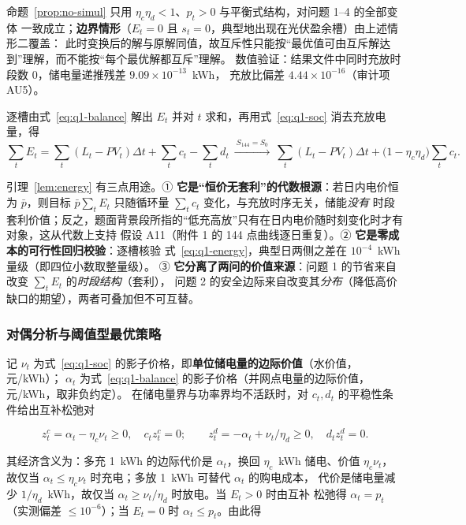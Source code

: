 命题~\ref{prop:no-simul} 只用 \(\eta_c\eta_d<1\)、\(p_t>0\) 与平衡式结构，对问题 1--4 的全部变体
一致成立；\textbf{边界情形}（\(E_t=0\) 且 \(s_t=0\)，典型地出现在光伏盈余槽）由上述情形二覆盖：
此时变换后的解与原解同值，故互斥性只能按“最优值可由互斥解达到”理解，而不能按“每个最优解都互斥”理解。
数值验证：结果文件中同时充放时段数 0，储电量递推残差 \(9.09\times10^{-13}\)~kWh，
充放比偏差 \(4.44\times10^{-16}\)（审计项 AU5）。

\begin{lemma}[能量恒等式]\label{lem:energy}
逐槽由式~\eqref{eq:q1-balance} 解出 \(E_t\) 并对 \(t\) 求和，再用式~\eqref{eq:q1-soc} 消去充放电量，得
\begin{equation}
  \sum_{t}E_t=\sum_{t}(L_t-PV_t)\Delta t+\sum_{t}c_t-\sum_{t}d_t
  \ \xrightarrow{\ S_{144}=S_0\ }\
  \sum_{t}(L_t-PV_t)\Delta t+\bigl(1-\eta_c\eta_d\bigr)\sum_{t}c_t .
  \label{eq:q1-energy}
\end{equation}
\end{lemma}

引理~\ref{lem:energy} 有三点用途。① \textbf{它是“恒价无套利”的代数根源}：若日内电价恒为
\(\bar p\)，则目标 \(\bar p\sum_tE_t\) 只随循环量 \(\sum_tc_t\) 变化，与充放时序无关，储能\emph{没有}
时段套利价值；反之，题面背景段所指的“低充高放”只有在日内电价随时刻变化时才有对象，这从代数上支持
假设 A11（附件 1 的 144 点曲线逐日重复）。② \textbf{它是零成本的可行性回归校验}：逐槽核验
式~\eqref{eq:q1-energy}，典型日两侧之差在 \(10^{-4}\)~kWh 量级（即四位小数取整量级）。
③ \textbf{它分离了两问的价值来源}：问题 1 的节省来自改变 \(\sum_tE_t\) 的\emph{时段结构}（套利），
问题 2 的安全边际来自改变其\emph{分布}（降低高价缺口的期望），两者可叠加但不可互替。

\subsubsection{对偶分析与阈值型最优策略}

记 \(\nu_t\) 为式~\eqref{eq:q1-soc} 的影子价格，即\textbf{单位储电量的边际价值}（水价值，元/kWh）；
\(\alpha_t\) 为式~\eqref{eq:q1-balance} 的影子价格（并网点电量的边际价值，元/kWh，取非负约定）。
在储电量界与功率界均不活跃时，对 \(c_t,d_t\) 的平稳性条件给出互补松弛对

\begin{equation}
  z^{c}_t=\alpha_t-\eta_c\nu_t\ge0,\quad c_tz^{c}_t=0;\qquad
  z^{d}_t=-\alpha_t+\nu_t/\eta_d\ge0,\quad d_tz^{d}_t=0 .
  \label{eq:q1-kkt}
\end{equation}

其经济含义为：多充 1~kWh 的边际代价是 \(\alpha_t\)，换回 \(\eta_c\)~kWh 储电、价值
\(\eta_c\nu_t\)，故仅当 \(\alpha_t\le\eta_c\nu_t\) 时充电；多放 1~kWh 可替代 \(\alpha_t\) 的购电成本，
代价是储电量减少 \(1/\eta_d\)~kWh，故仅当 \(\alpha_t\ge\nu_t/\eta_d\) 时放电。当 \(E_t>0\) 时由互补
松弛得 \(\alpha_t=p_t\)（实测偏差 \(\le10^{-6}\)）；当 \(E_t=0\) 时 \(\alpha_t\le p_t\)。由此得

